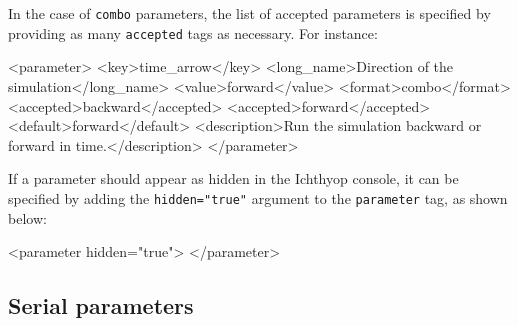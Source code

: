 \documentclass[
  letterpaper,
  DIV=11,
  numbers=noendperiod]{scrreprt}
\newenvironment{Shaded}{\begin{snugshade}}{\end{snugshade}}
\newcommand{\KeywordTok}[1]{\textcolor[rgb]{0.00,0.23,0.31}{#1}}
\newcommand{\NormalTok}[1]{\textcolor[rgb]{0.00,0.23,0.31}{#1}}
\newcommand{\OtherTok}[1]{\textcolor[rgb]{0.00,0.23,0.31}{#1}}
\newcommand{\StringTok}[1]{\textcolor[rgb]{0.13,0.47,0.30}{#1}}
\begin{document}
In the case of \texttt{combo} parameters, the list of accepted
parameters is specified by providing as many \texttt{accepted} tags as
necessary. For instance:

\begin{Shaded}
\begin{Highlighting}[]
\NormalTok{\textless{}}\KeywordTok{parameter}\NormalTok{\textgreater{}}
\NormalTok{    \textless{}}\KeywordTok{key}\NormalTok{\textgreater{}time\_arrow\textless{}/}\KeywordTok{key}\NormalTok{\textgreater{}}
\NormalTok{    \textless{}}\KeywordTok{long\_name}\NormalTok{\textgreater{}Direction of the simulation\textless{}/}\KeywordTok{long\_name}\NormalTok{\textgreater{}}
\NormalTok{    \textless{}}\KeywordTok{value}\NormalTok{\textgreater{}forward\textless{}/}\KeywordTok{value}\NormalTok{\textgreater{}}
\NormalTok{    \textless{}}\KeywordTok{format}\NormalTok{\textgreater{}combo\textless{}/}\KeywordTok{format}\NormalTok{\textgreater{}}
\NormalTok{    \textless{}}\KeywordTok{accepted}\NormalTok{\textgreater{}backward\textless{}/}\KeywordTok{accepted}\NormalTok{\textgreater{}}
\NormalTok{    \textless{}}\KeywordTok{accepted}\NormalTok{\textgreater{}forward\textless{}/}\KeywordTok{accepted}\NormalTok{\textgreater{}}
\NormalTok{    \textless{}}\KeywordTok{default}\NormalTok{\textgreater{}forward\textless{}/}\KeywordTok{default}\NormalTok{\textgreater{}}
\NormalTok{    \textless{}}\KeywordTok{description}\NormalTok{\textgreater{}Run the simulation backward or forward in time.\textless{}/}\KeywordTok{description}\NormalTok{\textgreater{}}
\NormalTok{\textless{}/}\KeywordTok{parameter}\NormalTok{\textgreater{}}
\end{Highlighting}
\end{Shaded}

If a parameter should appear as hidden in the Ichthyop console, it can
be specified by adding the \texttt{hidden="true"} argument to the
\texttt{parameter} tag, as shown below:

\begin{Shaded}
\begin{Highlighting}[]
\NormalTok{\textless{}}\KeywordTok{parameter}\OtherTok{ hidden=}\StringTok{"true"}\NormalTok{\textgreater{}}
\NormalTok{\textless{}/}\KeywordTok{parameter}\NormalTok{\textgreater{}}
\end{Highlighting}
\end{Shaded}

\subsection{Serial parameters}\label{serial-parameters}
\end{document}
